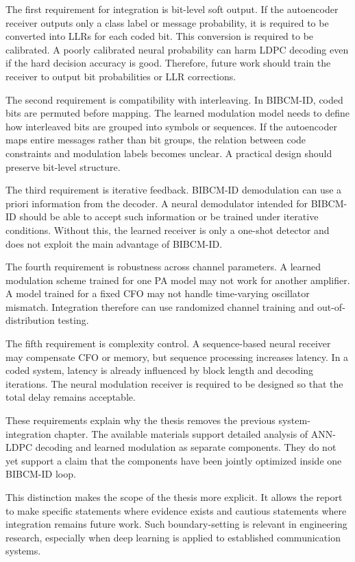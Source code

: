 The first requirement for integration is bit-level soft output. If the autoencoder receiver outputs only a class label or message probability, it is required to be converted into LLRs for each coded bit. This conversion is required to be calibrated. A poorly calibrated neural probability can harm LDPC decoding even if the hard decision accuracy is good. Therefore, future work should train the receiver to output bit probabilities or LLR corrections.

The second requirement is compatibility with interleaving. In BIBCM-ID, coded bits are permuted before mapping. The learned modulation model needs to define how interleaved bits are grouped into symbols or sequences. If the autoencoder maps entire messages rather than bit groups, the relation between code constraints and modulation labels becomes unclear. A practical design should preserve bit-level structure.

The third requirement is iterative feedback. BIBCM-ID demodulation can use a priori information from the decoder. A neural demodulator intended for BIBCM-ID should be able to accept such information or be trained under iterative conditions. Without this, the learned receiver is only a one-shot detector and does not exploit the main advantage of BIBCM-ID.

The fourth requirement is robustness across channel parameters. A learned modulation scheme trained for one PA model may not work for another amplifier. A model trained for a fixed CFO may not handle time-varying oscillator mismatch. Integration therefore can use randomized channel training and out-of-distribution testing.

The fifth requirement is complexity control. A sequence-based neural receiver may compensate CFO or memory, but sequence processing increases latency. In a coded system, latency is already influenced by block length and decoding iterations. The neural modulation receiver is required to be designed so that the total delay remains acceptable.

These requirements explain why the thesis removes the previous system-integration chapter. The available materials support detailed analysis of ANN-LDPC decoding and learned modulation as separate components. They do not yet support a claim that the components have been jointly optimized inside one BIBCM-ID loop.

This distinction makes the scope of the thesis more explicit. It allows the report to make specific statements where evidence exists and cautious statements where integration remains future work. Such boundary-setting is relevant in engineering research, especially when deep learning is applied to established communication systems.

